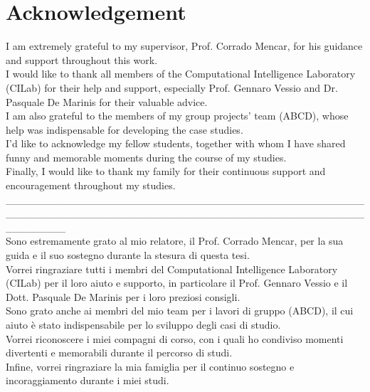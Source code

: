 \chapter*{\Large \center Acknowledgement}

I am extremely grateful to my supervisor, Prof. Corrado Mencar, for his guidance and support throughout this work.
\\[0.3cm]I would like to thank all members of the Computational Intelligence Laboratory (CILab) for their help and support, especially Prof. Gennaro Vessio and Dr. Pasquale De Marinis for their valuable advice.
\\[0.3cm]I am also grateful to the members of my group projects' team (ABCD), whose help was indispensable for developing the case studies.
\\[0.3cm]I'd like to acknowledge my fellow students, together with whom I have shared funny and memorable moments during the course of my studies.
\\[0.3cm]Finally, I would like to thank my family for their continuous support and encouragement throughout my studies.
\\[0.1cm]
\_\_\_\_\_\_\_\_\_\_\_\_\_\_\_\_\_\_\_\_\_\_\_\_\_\_\_\_\_\_\_\_\_\_\_\_\_\_\_\_\_\_\_\_\_\_\_\_\_\_\_\_\_\_\_\_\_\_\_\_\_\_\_\_\_\_\_\_\_\_\_\_\_\_\_\_\_\_\_\_\_\_\_\_\_\_\_\_\_\_\_\_\_\_\_\_\_\_\_\_\_\_\_\_
\\[0.3cm]
Sono estremamente grato al mio relatore, il Prof. Corrado Mencar, per la sua guida e il suo sostegno durante la stesura di questa tesi.
\\[0.3cm]Vorrei ringraziare tutti i membri del Computational Intelligence Laboratory (CILab) per il loro aiuto e supporto, in particolare il Prof. Gennaro Vessio e il Dott. Pasquale De Marinis per i loro preziosi consigli.
\\[0.3cm]Sono grato anche ai membri del mio team per i lavori di gruppo (ABCD), il cui aiuto è stato indispensabile per lo sviluppo degli casi di studio.
\\[0.3cm]Vorrei riconoscere i miei compagni di corso, con i quali ho condiviso momenti divertenti e memorabili durante il percorso di studi.
\\[0.3cm]Infine, vorrei ringraziare la mia famiglia per il continuo sostegno e incoraggiamento durante i miei studi.